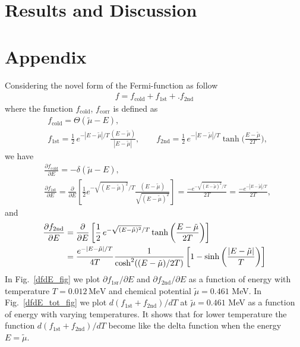 \documentclass[sn-mathphys,Numbered]{sn-jnl}
\theoremstyle{thmstyleone}%
\theoremstyle{thmstyletwo}%
\theoremstyle{thmstylethree}%
\begin{document}
\section{Results and Discussion}\label{sec12}


\section{Appendix}
Considering the novel form of  the Fermi-function as follow
\begin{align}
f=f_{\mathrm{cold}}+f_\mathrm{1st}+.f_\mathrm{2nd}
\end{align}
where the function $f_{\mathrm{cold}}$, $f_\mathrm{corr}$ is defined as
\begin{align}
&f_{\mathrm{cold}}=\Theta(\tilde\mu-E),\\
&f_\mathrm{1st}=\frac{1}{2}\,e^{-|E-\tilde\mu|/T}\frac{(E-\tilde\mu)}{|E-\tilde\mu|},\qquad 
f_\mathrm{2nd}=\frac{1}{2}\,e^{-|E-\tilde\mu|/T}\tanh\bigg(\frac{E-\tilde\mu}{2T}\bigg),
\end{align}
we have 
\begin{align}
&\frac{\partial f_{\mathrm{cold}}}{\partial E}=-\delta(\tilde\mu-E),\\
&\frac{\partial f_{\mathrm{1st}}}{\partial E}\!=\!\frac{\partial}{\partial E}\!\!\left[\frac{1}{2}e^{-\sqrt{(E-\tilde\mu)^2}/T}\frac{(E-\tilde\mu)}{\sqrt{(E-\tilde\mu)^2}}\right]\!\!=\!\frac{-e^{-\sqrt{(E-\tilde\mu)^2}/T}}{2T}\!=\!\frac{-e^{-|E-\tilde\mu|/T}}{2T},
\end{align}
and
\begin{align}
\frac{\partial f_{\mathrm{2nd}}}{\partial E}&=\frac{\partial}{\partial E}\left[\frac{1}{2}\,e^{-\sqrt{(E-\tilde\mu)^2}/T}\tanh\bigg(\frac{E-\tilde\mu}{2T}\bigg)\right]\notag\\
&=\frac{e^{-|E-\tilde\mu|/T}}{4T}\frac{1}{\cosh^2((E-\tilde\mu)/2T)}\left[1-\sinh\left(\frac{|E-\tilde\mu|}{T}\right)\right]
\end{align}
In Fig.~\ref{dfdE_fig} we plot $\partial f_{\mathrm{1sr}}/{\partial E}$ and $\partial f_{\mathrm{2nd}}/{\partial E}$ as a function of energy with temperature $T=0.012\,\mathrm{MeV}$ and chemical potential $\tilde\mu=0.461$ MeV. In Fig.~\ref{dfdE_tot_fig} we plot $d(f_\mathrm{1st}+f_\mathrm{2nd})/dT$  at $\tilde\mu=0.461$ MeV as a function of energy with varying temperatures. It shows that for lower temperature the function $d(f_\mathrm{1st}+f_\mathrm{2nd})/dT$ become like the delta function when the energy $E=\tilde\mu$.
\end{document}
